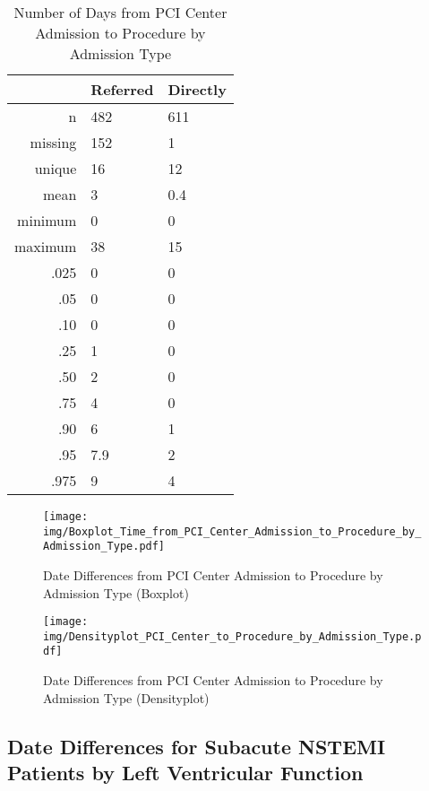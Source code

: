 \documentclass[a4paper]{report}
\begin{document}
\begin{itemize}
{%
\begin{table}[ht]
\centering
\begin{tabular}{rll}
  \toprule
 & Referred & Directly \\ 
  \midrule
n & 482 & 611 \\ 
  missing & 152 & 1 \\ 
  unique & 16 & 12 \\ 
  mean & 3 & 0.4 \\ 
  minimum & 0 & 0 \\ 
  maximum & 38 & 15 \\ 
  .025 & 0 & 0 \\ 
  .05 & 0 & 0 \\ 
  .10 & 0 & 0 \\ 
  .25 & 1 & 0 \\ 
  .50 & 2 & 0 \\ 
  .75 & 4 & 0 \\ 
  .90 & 6 & 1 \\ 
  .95 & 7.9 & 2 \\ 
  .975 & 9 & 4 \\ 
   \bottomrule
\end{tabular}
\caption{Number of Days from PCI Center Admission to Procedure by Admission Type} 
\end{table}
\begin{figure}
  \centering
  \caption{Date Differences from PCI Center Admission to Procedure by Admission Type (Boxplot)}
  \label{Boxplot: Date Differences from PCI Center Admission to Procedure by Admission Type}
\texttt{[image: img/Boxplot\_Time\_from\_PCI\_Center\_Admission\_to\_Procedure\_by\_Admission\_Type.pdf]}\end{figure}


\begin{figure}
  \centering
  \caption{Date Differences from PCI Center Admission to Procedure by Admission Type (Densityplot)}
  \label{Density: Date Differences from PCI Center Admission to Procedure by Admission Type}
\texttt{[image: img/Densityplot\_PCI\_Center\_to\_Procedure\_by\_Admission\_Type.pdf]}\end{figure}







\clearpage
\subsection{Date Differences for Subacute NSTEMI Patients by Left Ventricular Function}

}
\end{itemize}
\end{document}
